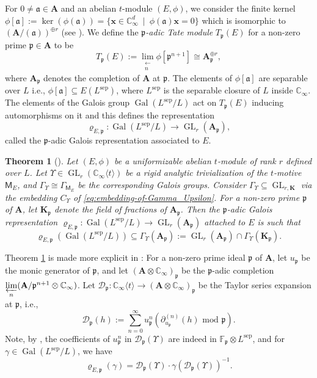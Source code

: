 \documentclass[10pt,a4paper]{amsart}
\theoremstyle{plain} %
\newtheorem{Theorem}{Theorem}[section]
\theoremstyle{definition}
\theoremstyle{remark}
\newcommand{\CC}{\mathbb{C}}
\newcommand{\FF}{\mathbb{F}}
\newcommand{\fp}{\mathfrak{p}}  %
\newcommand{\bA}{\mathbf{A}}
\newcommand{\bK}{\mathbf{K}}
\newcommand{\Fpp}{\FF_{\!\fp}} %
\newcommand{\Gal}{\operatorname{Gal}}
\newcommand{\GL}{\operatorname{GL}}
\newcommand{\KI}{\mathbb{K}_{\infty}}  %
\newcommand{\CI}{\CC_{\infty}}  %
\newcommand{\cs}[1]{\langle #1 \rangle} %
\newcommand{\mot}{\mathsf{M}}  %
\newcommand{\up}{u_\fp}  %
\newcommand{\sep}{\mathrm{sep}}
\newcommand{\D}{\mathcal{D}} %
\numberwithin{equation}{subsection}
\begin{document}
For $0\neq \mathfrak{a} \in \bA$ and an abelian $t$-module $(E, \phi)$, we consider the finite kernel 
$\phi[\mathfrak{a}]:= \ker(\phi(\mathfrak{a})) = \{ \boldsymbol{x} \in \CC_\infty^d \ \mid \ \phi(\mathfrak{a})\boldsymbol{x}=0\}$ which is isomorphic to $(\bA/(\mathfrak{a}))^{\oplus r}$ (see \cite[Thm.~7.2.1]{dt:ffa}). We define the \emph{$\fp$-adic Tate module} $T_\fp(E)$ for a non-zero prime $\fp \in \bA$ to be
\[
T_{\fp}(E) := \lim_{\substack{\longleftarrow \\ n}} \phi[\fp^{n+1}] \cong \bA_\fp^{\oplus r}, 
\]
where $\bA_\fp$ denotes the completion of $\bA$ at $\fp$. 
The elements of $\phi[\mathfrak{a}]$ are separable over $L$ i.e., $\phi[\mathfrak{a}] \subseteq E(L^{\sep})$, where $L^{\sep}$ is the separable closure of $L$ inside $\CC_{\infty}$. The elements of the Galois group $\Gal(L^\sep/L)$ act on $T_{\fp}(E)$ inducing automorphisms on it and this defines the representation
\[
\varrho_{E,\fp}:\Gal(L^\sep/L)\to\GL_r(\bA_\fp),\]
called the $\fp$-adic Galois representation associated to $E$. 

\begin{Theorem}[{\cite[Theorem 9.10]{am:naamcigp}}] \label{thm:Galois-representation}
Let $(E, \phi)$ be a uniformizable abelian $t$-module of rank $r$ defined over $L$.
Let $\Upsilon\in \GL_{r}(\CI\cs{t})$ be a rigid analytic trivialization of the $t$-motive $\mot_E$, and $\Gamma_\Upsilon\cong \Gamma_{\mot_E}$ be the corresponding Galois groups. Consider $\Gamma_\Upsilon\subseteq \GL_{r,\bK}$ via the embedding $C_\Upsilon$ of \eqref{eq:embedding-of-Gamma_Upsilon}. For a non-zero prime $\fp$ of $\bA$, let $\bK_{\fp}$ denote the field of fractions of $\bA_{\fp}$. Then the $\fp$-adic Galois representation $\varrho_{E,\fp}:\Gal(L^\mathrm{sep}/L)\to \GL_r(\bA_\fp)$ attached to $E$ is such that
\[ 
\varrho_{E,\fp}(\Gal(L^\mathrm{sep}/L)) \subseteq \Gamma_{\Upsilon} (\bA_{\fp}) := \GL_r(\bA_\fp) \cap \Gamma_{\Upsilon}(\bK_\fp).
\]
\end{Theorem}



Theorem \ref{thm:Galois-representation} is made more explicit in \cite[Rem.~2.18]{am:naamcigp}: For a non-zero prime ideal $\fp$ of $\bA$, let $\up$ be the monic generator of $\fp$, and let $(\bA\otimes\CI)_\fp$ be the $\fp$-adic completion $\varprojlim\limits_n(\bA/\fp^{n+1}\otimes \CC_\infty)$. 
Let $\D_\fp:\CI\cs{t}\to (\bA\otimes\CI)_\fp$ be the Taylor series expansion at $\fp$, i.e.,~
\[  \D_{\fp}(h):= \sum_{n=0}^\infty \up^n \left( \partial_{\up}^{(n)}(h)\textrm{ mod }\fp\right). \]
Note, by \cite[Theorem 9.6]{am:naamcigp}, the coefficients of $\up^n$ in $\D_\fp(\Upsilon)$ are indeed in $\Fpp\otimes L^{\sep}$, and for $\gamma\in \Gal(L^\sep/L)$, we have
\begin{equation}\label{eq:explicit-Galois-represenation}
     \varrho_{E,\fp}(\gamma) = \D_\fp(\Upsilon)\cdot \gamma(\D_\fp(\Upsilon))^{-1}. 
\end{equation} 
\end{document}
